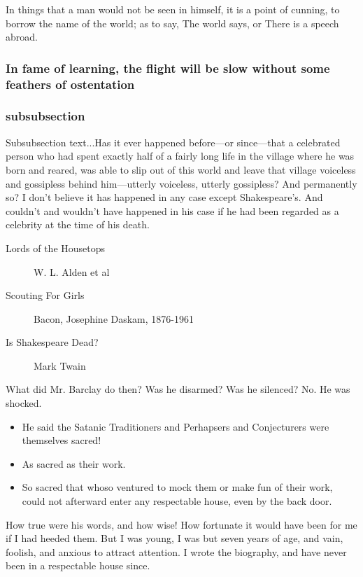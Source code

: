 \documentclass[a4paper, 12pt]{memoir}
\begin{document}
In things that a man would not be seen in himself, it is a point of cunning, to borrow the name of the world; as to say, The world says, or There is a speech abroad. 


\subsubsection*{ In fame of learning, the flight will be slow without some feathers of ostentation }
\subsubsection*{subsubsection} 
Subsubsection text...Has it ever happened before—or since—that a celebrated person who had spent exactly half of a fairly long life in the village where he was born and reared, was able to slip out of this world and leave that village voiceless and gossipless behind him—utterly voiceless, utterly gossipless?  And permanently so?  I don’t believe it has happened in any case except Shakespeare’s.  And couldn’t and wouldn’t have happened in his case if he had been regarded as a celebrity at the time of his death.
\begin{description} 
\item[Lords of the Housetops]W. L. Alden et al 
\item[Scouting For Girls] Bacon, Josephine Daskam, 1876-1961
\item[Is Shakespeare Dead?] Mark Twain
\end{description}

What did Mr. Barclay do then?  Was he disarmed?  Was he silenced?  No.  He was shocked.

\begin{itemize}[•\textbullet ] 
\item He said the Satanic Traditioners and Perhapsers and Conjecturers were themselves sacred!
\item  As sacred as their work.
\item  So sacred that whoso ventured to mock them or make fun of their work, could not afterward enter any respectable house, even by the back door.
\end{itemize}

How true were his words, and how wise!  How fortunate it would have been for me if I had heeded them.  But I was young, I was but seven years of age, and vain, foolish, and anxious to attract attention.  I wrote the biography, and have never been in a respectable house since.
\end{document}
